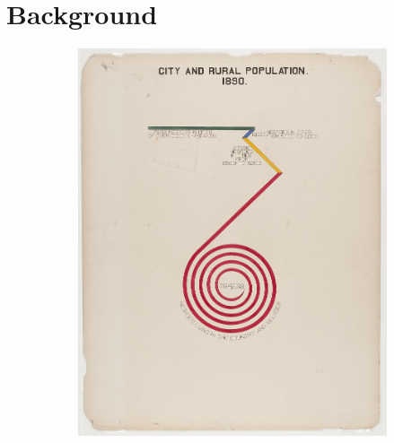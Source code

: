\documentclass[../main.tex]{subfiles}
\begin{document}
\section{Background}
\begin{figure}[H]
    \begin{subfigure}{.24\textwidth}
        \includegraphics[width=1\textwidth]{figures/intro/du_bois_spinny.png}
        \caption{}
        \label{fig:intro_dpa}
    \end{subfigure}
    \begin{subfigure}{.24\textwidth}

\end{subfigure}
\end{figure}
\end{document}
